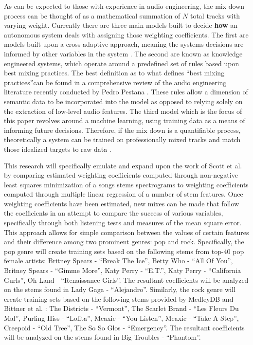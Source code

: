 \documentclass{article}
\begin{document}
As can be expected to those with experience in audio engineering, the mix down process can be thought of as a mathematical summation of $N$ total tracks with varying weight.  Currently there are three main models built to decide \textbf{how} an autonomous system deals with assigning those weighting coefficients.  The first are models built upon a cross adaptive approach, meaning the systems decisions are informed by other variables in the system \cite{mansbridge2012implementation}.  The second are known as knowledge engineered systems, which operate around a predefined set of rules based upon best mixing practices.  The best definition as to what defines ``best mixing practices''can be found in a comprehensive review of the audio engineering literature recently conducted by Pedro Pestana \cite{pestana2013automatic}.  These rules allow a dimension of semantic data to be incorporated into the model as opposed to relying solely on the extraction of low-level audio features.  The third model which is the focus of this paper revolves around a machine learning, using training data as a means of informing future decisions.  Therefore, if the mix down is a quantifiable process, theoretically a system can be trained on professionally mixed tracks and match those idealized targets to raw data \cite{scott2011automatic}.

This research will specifically emulate and expand upon the work of Scott et al. \cite{scott2011automatic} by comparing estimated weighting coefficients computed through non-negative least squares minimization of a songs stems spectrograms to weighting coefficients computed through multiple linear regression of a number of stem features.  Once weighting coefficients have been estimated, new mixes can be made that follow the coefficients in an attempt to compare the success of various variables, specifically through both listening tests and measures of the mean square error.  This approach allows for simple comparison between the values of certain features and their difference among two prominent genres: pop and rock.  Specifically, the pop genre will create training sets based on the following stems from top-40 pop female artists: Britney Spears - “Break The Ice”, Betty Who - “All Of You”, Britney Spears - “Gimme More”, Katy Perry - “E.T.”, Katy Perry - “California Gurls”, Oh Land - “Renaissance Girls”.  The resultant coefficients will be analyzed on the stems found in Lady Gaga - “Alejandro”.  Similarly, the rock genre will create training sets based on the following stems provided by MedleyDB and Bittner et al. \cite{bittner2014medleydb}: The Districts - “Vermont”, The Scarlet Brand - “Les Fleurs Du Mal”, Purling Hiss - “Lolita”, Meaxic - “You Listen”, Meaxic - “Take A Step”, Creepoid - “Old Tree”, The So So Glos - “Emergency”.  The resultant coefficients will be analyzed on the stems found in Big Troubles - “Phantom”. 
	
\end{document}
